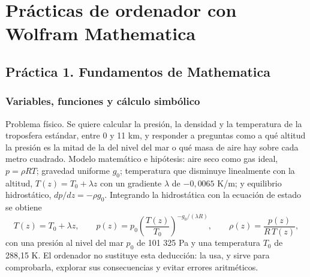 \documentclass[10pt,openany]{book}
\begin{document}
\part{Prácticas de ordenador con Wolfram Mathematica}

\chapter{Práctica 1. Fundamentos de Mathematica}
\label{chap:m01}


\section{Variables, funciones y cálculo simbólico}

Problema físico. Se quiere calcular la presión, la densidad y la temperatura de la troposfera estándar, entre 0 y 11 km, y responder a preguntas como a qué altitud la presión es la mitad de la del nivel del mar o qué masa de aire hay sobre cada metro cuadrado. Modelo matemático e hipótesis: aire seco como gas ideal, \(p = \rho R T\); gravedad uniforme \(g_0\); temperatura que disminuye linealmente con la altitud, \(T(z) = T_0 + \lambda z\) con un gradiente \(\lambda\) de \(-0{,}0065\) K/m; y equilibrio hidrostático, \(dp/dz = -\rho g_0\). Integrando la hidrostática con la ecuación de estado se obtiene
\begin{equation}
T(z) = T_0 + \lambda z,\qquad p(z) = p_0\left(\frac{T(z)}{T_0}\right)^{-g_0/(\lambda R)},\qquad \rho(z) = \frac{p(z)}{R\,T(z)}, \label{eq:m01-troposfera}
\end{equation}
con una presión al nivel del mar \(p_0\) de 101 325 Pa y una temperatura \(T_0\) de 288,15 K. El ordenador no sustituye esta deducción: la usa, y sirve para comprobarla, explorar sus consecuencias y evitar errores aritméticos.
\end{document}
